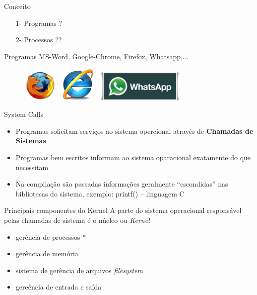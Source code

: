 \documentclass[11pt]{beamer}
\begin{document}
\begin{frame}{Conceito}
	\begin{itemize}
	\item[1-] Programas ?
	\vspace{0.2in}
	\item[2-] Processos ??
	\end{itemize}
\end{frame}


\begin{frame}{Programas}
	MS-Word, Google-Chrome, Firefox, Whatsapp,...
\begin{figure}[h]
\includegraphics[width=18mm, height=15mm]{Figuras/Firefox-logo.png}
\qquad \quad \quad \quad \quad \quad \quad
\includegraphics[width=19mm, height=17mm]{Figuras/IE.png}
\qquad \quad \quad \quad \quad \quad \quad
\includegraphics[width=45mm, height=15mm]{Figuras/whatsapp10.png}
\end{figure}
\end{frame}


\begin{frame}{System Calls}
\begin{itemize}
 \item Programas solicitam serviços ao sistema opercional através de \textbf{Chamadas de Sistemas} 
 \item Programas bem escritos informam ao sistema oparacional exatamente do que necessitam
 \item Na compilação são passadas informações geralmente ``escondidas'' nas bibliotecas do sistema, exemplo: printf() -- linguagem C
\end{itemize}
\end{frame}


\begin{frame}{Principais componentes do Kernel}
A parte do sistema operacional responsável pelas chamadas de sistema é o núcleo ou \textit{Kernel}
\begin{itemize}
 \item gerência de processos *
 \item gerência de memória
 \item sistema de gerência de arquivos \textit{filesystem}
 \item gereência de entrada e saída
\end{itemize}
\end{frame}
\end{document}
